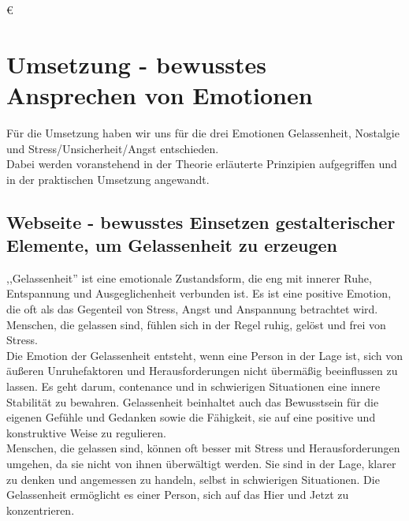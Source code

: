 €\documentclass[./dokumentation.tex]{subfiles}
\begin{document}
\chapter{Umsetzung - bewusstes Ansprechen von Emotionen}
Für die Umsetzung haben wir uns für die drei Emotionen Gelassenheit, Nostalgie und Stress/Unsicherheit/Angst entschieden.\\ 
Dabei werden voranstehend in der Theorie erläuterte Prinzipien aufgegriffen und in der praktischen Umsetzung angewandt.

\section{Webseite - bewusstes Einsetzen gestalterischer Elemente, um Gelassenheit zu erzeugen}
,,Gelassenheit'' ist eine emotionale Zustandsform, die eng mit innerer Ruhe, Entspannung und Ausgeglichenheit verbunden ist. Es ist eine positive Emotion, die oft als das Gegenteil von Stress, Angst und Anspannung betrachtet wird. Menschen, die gelassen sind, fühlen sich in der Regel ruhig, gelöst und frei von Stress. \\
Die Emotion der Gelassenheit entsteht, wenn eine Person in der Lage ist, sich von äußeren Unruhefaktoren und Herausforderungen nicht übermäßig beeinflussen zu lassen. Es geht darum, contenance und in schwierigen Situationen eine innere Stabilität zu bewahren. Gelassenheit beinhaltet auch das Bewusstsein für die eigenen Gefühle und Gedanken sowie die Fähigkeit, sie auf eine positive und konstruktive Weise zu regulieren. \\
Menschen, die gelassen sind, können oft besser mit Stress und Herausforderungen umgehen, da sie nicht von ihnen überwältigt werden. Sie sind in der Lage, klarer zu denken und angemessen zu handeln, selbst in schwierigen Situationen. Die Gelassenheit ermöglicht es einer Person, sich auf das Hier und Jetzt zu konzentrieren.\\
\end{document}
